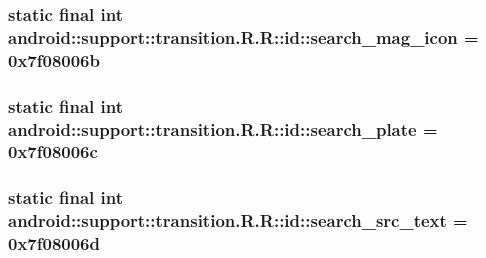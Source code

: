 \hypertarget{classandroid_1_1support_1_1transition_1_1_r_1_1id_52d2b481e4252b627aa29bf14973c089}{
\subsubsection[{search\_\-mag\_\-icon}]{\setlength{\rightskip}{0pt plus 5cm}static final int android::support::transition.R.R::id::search\_\-mag\_\-icon = 0x7f08006b}}
\label{classandroid_1_1support_1_1transition_1_1_r_1_1id_52d2b481e4252b627aa29bf14973c089}


\hypertarget{classandroid_1_1support_1_1transition_1_1_r_1_1id_d48a3dae9de898922da42a287352c5a8}{
\subsubsection[{search\_\-plate}]{\setlength{\rightskip}{0pt plus 5cm}static final int android::support::transition.R.R::id::search\_\-plate = 0x7f08006c}}
\label{classandroid_1_1support_1_1transition_1_1_r_1_1id_d48a3dae9de898922da42a287352c5a8}


\hypertarget{classandroid_1_1support_1_1transition_1_1_r_1_1id_46cac1df9dc0b4048abbef0a2536b800}{
\subsubsection[{search\_\-src\_\-text}]{\setlength{\rightskip}{0pt plus 5cm}static final int android::support::transition.R.R::id::search\_\-src\_\-text = 0x7f08006d}}
\label{classandroid_1_1support_1_1transition_1_1_r_1_1id_46cac1df9dc0b4048abbef0a2536b800}



